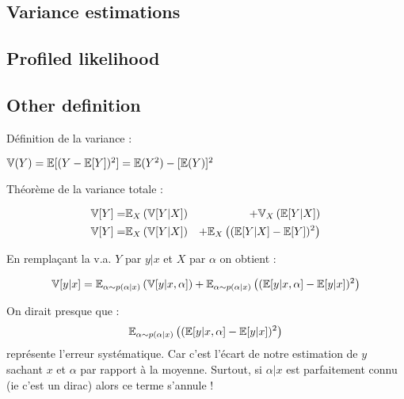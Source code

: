 \subsection{Variance estimations} %
\label{sub:variance_estimations}





\subsection{Profiled likelihood} %
\label{sub:profiled_likelihood}






\subsection{Other definition} %
\label{sub:other_definition}

Définition de la variance :

$\mathbb{V}(Y) = \mathbb{E}[(Y - \mathbb{E}[Y])^2] = \mathbb{E}(Y^2) - [\mathbb{E}(Y)]^2$

Théorème de la variance totale \needcite :

\begin{eqnarray}
    \mathbb{V}[Y] =& \mathbb{E}_X \left (\mathbb{V}[Y|X] \right ) &+ \mathbb{V}_X \left (\mathbb{E}[Y|X]\right ) \\
    \mathbb{V}[Y] =& \mathbb{E}_X \left (\mathbb{V}[Y|X] \right ) &+ \mathbb{E}_X \left ( (\mathbb{E} [Y|X]  - \mathbb{E}[Y])^2\right )
\end{eqnarray}


En remplaçant la v.a. $Y$ par $y|x$ et $X$ par $\alpha$ on obtient :

$$
\mathbb{V}[y|x] = \mathbb{E}_{\alpha \sim p(\alpha|x)} \left (\mathbb{V}[y|x, \alpha] \right ) + \mathbb{E}_{\alpha \sim p(\alpha|x)} \left ( (\mathbb{E} [y|x, \alpha]  - \mathbb{E}[y|x])^2\right )
$$


On dirait presque que : 
$$\mathbb{E}_{\alpha \sim p(\alpha|x)} \left ((\mathbb{E} [y|x, \alpha]  - \mathbb{E}[y|x])^2\right )$$
représente l'erreur systématique. 
Car c'est l'écart de notre estimation de $y$ sachant $x$ et $\alpha$ par rapport à la moyenne.
Surtout, si $\alpha|x$ est parfaitement connu (ie c'est un dirac) alors ce terme s'annule !

